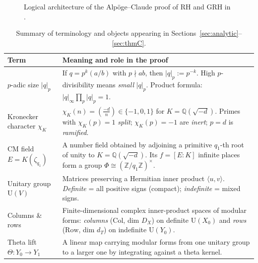 \documentclass[11pt]{amsart}
\newcommand{\code}[1]{\ifmmode\text{\normalfont\ttfamily\nolinkurl{#1}}\else{\upshape\mdseries\ttfamily\nolinkurl{#1}}\fi}
\newcommand{\QQ}{\mathbb{Q}}
\newcommand{\ZZ}{\mathbb{Z}}
\newcommand{\Ugrp}{\mathrm{U}}
\newcommand{\Col}{\mathrm{Col}}
\newcommand{\Row}{\mathrm{Row}}
\theoremstyle{definition}
\theoremstyle{remark}
\begin{document}
\begin{figure}[tbp]
\caption{Logical architecture of the Alp\"oge--Claude proof of RH and GRH in \code{grh-compact}.}\label{fig:arch}
\end{figure}

\begin{table}[tbp]
\centering\footnotesize
\caption{Summary of terminology and objects appearing in Sections~\ref{sec:analytic}--\ref{sec:thmC}.}\label{tab:glossary}
\begin{tabular}{@{}>{\raggedright\arraybackslash}p{}>{\raggedright\arraybackslash}p{}@{}}
\toprule
Term & Meaning and role in the proof\\
\midrule
$p$-adic size $|q|_p$ & If $q=p^k(a/b)$ with $p\nmid ab$, then $|q|_p:=p^{-k}$. High $p$-divisibility means \emph{small} $|q|_p$. Product formula: $|q|_\infty\prod_p|q|_p=1$.\\
\addlinespace[2pt]
Kronecker character $\chi_K$ & $\chi_K(n)=(\frac{-d}{n})\in\{-1,0,1\}$ for $K=\QQ(\sqrt{-d})$. Primes with $\chi_K(p)=1$ \emph{split}; $\chi_K(p)=-1$ are \emph{inert}; $p=d$ is \emph{ramified}.\\
\addlinespace[2pt]
CM field $E=K(\zeta_{q_1})$ & A number field obtained by adjoining a primitive $q_1$-th root of unity to $K=\QQ(\sqrt{-d})$. Its $f=[E:K]$ infinite places form a group $\Phi\cong(\ZZ/q_1\ZZ)^\times$.\\
\addlinespace[2pt]
Unitary group $\Ugrp(V)$ & Matrices preserving a Hermitian inner product $\langle u,v\rangle$. \emph{Definite} = all positive signs (compact); \emph{indefinite} = mixed signs.\\
\addlinespace[2pt]
Columns \& rows & Finite-dimensional complex inner-product spaces of modular forms: \emph{columns} ($\Col$, dim $D_X$) on definite $\Ugrp(X_0)$ and \emph{rows} ($\Row$, dim $d_T$) on indefinite $\Ugrp(Y_0)$.\\
\addlinespace[2pt]
Theta lift $\Theta\colon Y_0\to Y_1$ & A linear map carrying modular forms from one unitary group to a larger one by integrating against a theta kernel.\\

\end{tabular}
\end{table}
\end{document}
